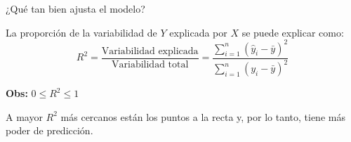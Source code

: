 \documentclass[aspectratio=169, usenames,dvipsnames]{beamer}
\begin{document}
\begin{frame}
    \Large
    ¿Qué tan bien ajusta el modelo?
    \vspace{1em}

    \normalsize
    La proporción de la variabilidad de $Y$ explicada por $X$ se puede explicar como:
    \[R^2 = \dfrac{\text{Variabilidad explicada}}{\text{Variabilidad total}} = \dfrac{\sum_{i=1}^n (\hat{y}_i - \bar{y})^2}{\sum_{i=1}^n (y_i - \bar{y})^2}\]

    \pause
    \vspace{1em}
    \textbf{Obs:} $0\leq R^2 \leq 1$

    A mayor $R^2$ más cercanos están los puntos a la recta y, por lo tanto, tiene más poder de predicción.
    
\end{frame}
\end{document}
